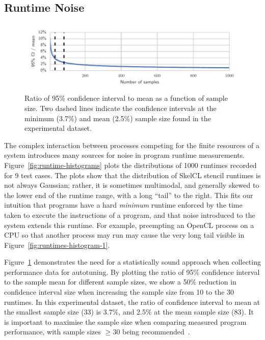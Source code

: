 \documentclass[nonatbib,preprint,9pt]{sigplanconf}
\begin{document}
\subsection{Runtime Noise}

\begin{figure}
\centering
\includegraphics[width=\columnwidth]{img/ci_trend}
\caption[Confidence interval size vs.\ sample count]{%
  Ratio of 95\% confidence interval to mean as a function of sample
  size. Two dashed lines indicate the confidence intervals at the
  minimum (3.7\%) and mean (2.5\%) sample size found in the
  experimental dataset.%
}
\label{fig:ci-trends}
\end{figure}

The complex interaction between processes competing for the finite
resources of a system introduces many sources for noise in program
runtime measurements. Figure~\ref{fig:runtime-histograms} plots the
distributions of 1000 runtimes recorded for 9 test cases. The plots
show that the distribution of SkelCL stencil runtimes is not always
Gaussian; rather, it is sometimes multimodal, and generally skewed to
the lower end of the runtime range, with a long ``tail'' to the
right. This fits our intuition that programs have a hard
\emph{minimum} runtime enforced by the time taken to execute the
instructions of a program, and that noise introduced to the system
extends this runtime. For example, preempting an OpenCL process on a
CPU so that another process may run may cause the very long tail
visible in Figure~\ref{fig:runtimes-histogram-1}.

Figure~\ref{fig:ci-trends} demonstrates the need for a statistically
sound approach when collecting performance data for autotuning. By
plotting the ratio of 95\% confidence interval to the sample mean for
different sample sizes, we show a 50\% reduction in confidence
interval size when increasing the sample size from 10 to the 30
runtimes. In this experimental dataset, the ratio of confidence
interval to mean at the smallest sample size (33) is 3.7\%, and 2.5\%
at the mean sample size (83). It is important to maximise the sample
size when comparing measured program performance, with sample sizes
$\ge 30$ being recommended~\cite{Georges2007}.
\end{document}
